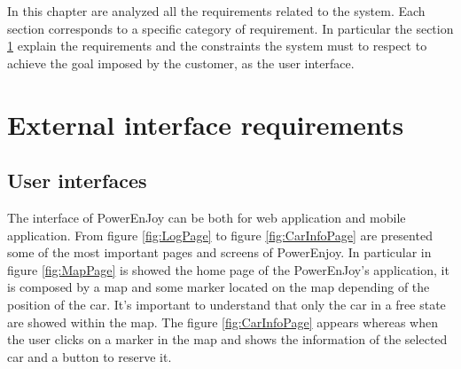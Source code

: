 In this chapter are analyzed all the requirements related to the system. Each section corresponds to a specific category of requirement. In particular the section \ref{sec:ExternalInterface} explain the requirements and the constraints the system must to respect to achieve the goal imposed by the customer, as the user interface.
\section{External interface requirements}\label{sec:ExternalInterface}
\subsection{User interfaces}
The interface of PowerEnJoy can be both for web application and mobile application. From figure \ref{fig:LogPage} to figure \ref{fig:CarInfoPage} are presented some of the most important pages and screens of PowerEnjoy. In particular in figure \ref{fig:MapPage} is showed the home page of the PowerEnJoy's application, it is composed by a map and some marker located on the map depending of the position of the car. It's important to understand that only the car in a free state are showed within the map. The figure \ref{fig:CarInfoPage} appears whereas when the user clicks on a marker in the map and shows the information of the selected car and a button to reserve it.
\begin{itemize}
\end{itemize}
\newpage
